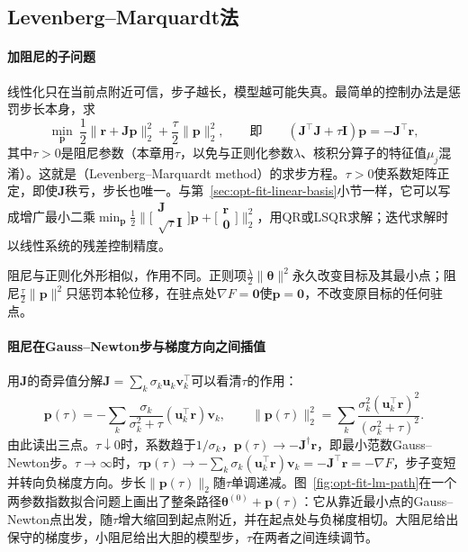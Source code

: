\subsection{Levenberg--Marquardt法}
\label{sec:opt-fit-levenberg-marquardt}

\paragraph{加阻尼的子问题}
线性化只在当前点附近可信，步子越长，模型越可能失真。最简单的控制办法是惩罚步长本身，求
\begin{equation}
  \min_{\bm p}\ \frac12\|\bm r+\bm J\bm p\|_2^2+\frac\tau2\|\bm p\|_2^2,
  \qquad\text{即}\qquad
  (\bm J^\top\bm J+\tau\bm I)\bm p=-\bm J^\top\bm r ,
  \label{eq:opt-fit-lm-step}
\end{equation}
其中$\tau>0$是阻尼参数（本章用$\tau$，以免与正则化参数$\lambda$、核积分算子的特征值$\mu_j$混淆）。这就是（Levenberg--Marquardt method）的求步方程。$\tau>0$使系数矩阵正定，即使$\bm J$秩亏，步长也唯一。与第~\ref{sec:opt-fit-linear-basis}小节一样，它可以写成增广最小二乘$\min_{\bm p}\tfrac12\bigl\|\bigl[\begin{smallmatrix}\bm J\\\sqrt\tau\bm I\end{smallmatrix}\bigr]\bm p+\bigl[\begin{smallmatrix}\bm r\\\bm 0\end{smallmatrix}\bigr]\bigr\|_2^2$，用QR或LSQR求解；迭代求解时以线性系统的残差控制精度。

阻尼与正则化外形相似，作用不同。正则项$\tfrac\lambda2\|\bm\theta\|^2$永久改变目标及其最小点；阻尼$\tfrac\tau2\|\bm p\|^2$只惩罚本轮位移，在驻点处$\nabla F=\bm 0$使$\bm p=\bm 0$，不改变原目标的任何驻点。

\paragraph{阻尼在Gauss--Newton步与梯度方向之间插值}
用$\bm J$的奇异值分解$\bm J=\sum_k\sigma_k\bm u_k\bm v_k^\top$可以看清$\tau$的作用：
\[
  \bm p(\tau)=-\sum_k\frac{\sigma_k}{\sigma_k^2+\tau}(\bm u_k^\top\bm r)\bm v_k,\qquad
  \|\bm p(\tau)\|_2^2=\sum_k\frac{\sigma_k^2(\bm u_k^\top\bm r)^2}{(\sigma_k^2+\tau)^2}.
\]
由此读出三点。$\tau\downarrow0$时，系数趋于$1/\sigma_k$，$\bm p(\tau)\to-\bm J^\dagger\bm r$，即最小范数Gauss--Newton步。$\tau\to\infty$时，$\tau\bm p(\tau)\to-\sum_k\sigma_k(\bm u_k^\top\bm r)\bm v_k=-\bm J^\top\bm r=-\nabla F$，步子变短并转向负梯度方向。步长$\|\bm p(\tau)\|_2$随$\tau$单调递减。图~\ref{fig:opt-fit-lm-path}在一个两参数指数拟合问题上画出了整条路径$\bm\theta^{(0)}+\bm p(\tau)$：它从靠近最小点的Gauss--Newton点出发，随$\tau$增大缩回到起点附近，并在起点处与负梯度相切。大阻尼给出保守的梯度步，小阻尼给出大胆的模型步，$\tau$在两者之间连续调节。


